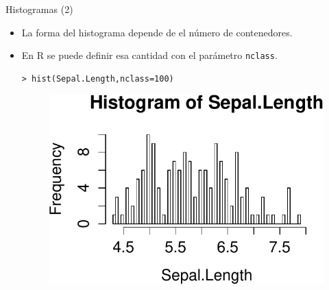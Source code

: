 \documentclass[handout]{beamer}
\begin{document}
\begin{frame}[fragile]{Histogramas (2) }
\scriptsize{
\begin{itemize}
 \item La forma del histograma depende de el número de contenedores.
 \item En R se puede definir esa cantidad con el parámetro \verb+nclass+.
 \begin{verbatim}
> hist(Sepal.Length,nclass=100)
 \end{verbatim}
 \begin{figure}[h!]
	\centering
	\includegraphics[scale=0.6]{pics/hist2.pdf}
	
	
\end{figure} 

\end{itemize}

}
\end{frame}
\end{document}
